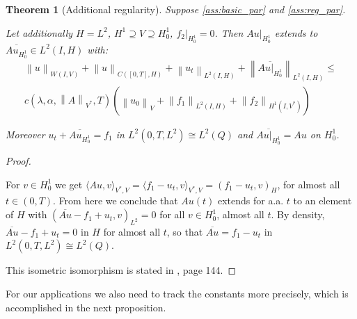 \documentclass[english,a4paper,12pt,oneside]{scrbook}
\theoremstyle{break}
\newtheorem{thm}[equation]{Theorem}
\newenvironment{mproof}[1][\proofname]{%
  \begin{proof}[#1]$ $\par\nobreak\ignorespaces
}{%
  \end{proof}
}
\renewcommand*{\proofname}{Proof}
\theoremstyle{remark}
\newcommand{\norm}[1]{\left\lVert#1\right\rVert}
\newcommand{\VN}[1]{\norm{#1}_{V}}
\newcommand{\VSN}[1]{\norm{#1}_{V^*}}
\begin{document}
\begin{thm}[Additional regularity]
\label{thm:par_reg}
Suppose \cref{ass:basic_par} and \cref{ass:reg_par}. 

Let additionally $H=L^2$, $H^1\supseteq V\supseteq H^1_0$,  $f_2|_{H^1_0}=0$. Then $Au|_{H^1_0}$ extends to $\overline{Au_{H^1_0}} \in L^2(I,H)$ with:
\begin{align}
	\norm{u}_{W(I,V)} + \norm{u}_{C([0,T],H)} + \norm{u_t}_{L^2(I,H)} +\norm{\overline{Au|_{H^1_0}}}_{L^2(I,H)}\leq\\ c(\lambda, \alpha, \VSN{A}, T)(\VN{u_0}+\norm{f_1}_{L^2(I,H)} + \norm{f_2}_{H^1(I,V^*)})
\end{align}

Moreover $u_t+\overline{Au_{H^1_0}}=f_1$ in $L^2(0,T,L^2)\cong L^2(Q)$ and $\overline{Au|_{H^1_0}}=Au$ on $H^1_0$.

\end{thm}
\begin{mproof}

For $v \in H^1_0$ we get $ \langle Au,v \rangle_{V^*,V} =  \langle f_1-u_t,v \rangle_{V^*,V} = ( f_1-u_t,v )_H$, for almost all $t \in (0,T)$. From here we conclude that $Au(t)$ extends for a.a. $t$ to an element of $H$ with $(\overline{Au}-f_1+u_t,v)_{L^2}=0$ for all $v \in H^1_0$, almost all $t$. By density, $\overline{Au}-f_1+u_t=0$ in $H$ for almost all $t$, so that $\overline{Au}=f_1-u_t$ in $L^2(0,T,L^2)\cong L^2(Q)$.

This isometric isomorphism is stated in \cite{trol}, page 144. 

\end{mproof}

For our applications we also need to track the constants more precisely, which is accomplished in the next proposition.
\end{document}
